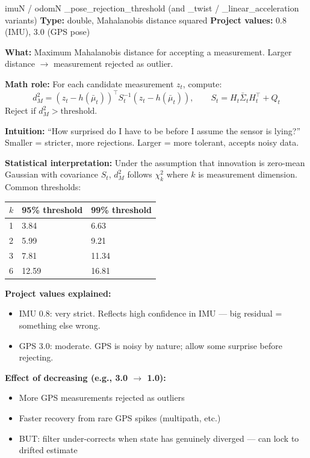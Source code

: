 \documentclass[11pt,a4paper]{article}
\begin{document}
\begin{paramcard}{imuN / odomN \_pose\_rejection\_threshold (and \_twist / \_linear\_acceleration variants)}
\textbf{Type:} double, Mahalanobis distance squared \quad \textbf{Project values:} 0.8 (IMU), 3.0 (GPS pose)

\textbf{What:} Maximum Mahalanobis distance for accepting a measurement. Larger distance $\to$ measurement rejected as outlier.

\textbf{Math role:} For each candidate measurement $z_t$, compute:
\[
d_M^2 = (z_t - h(\bar{\mu}_t))^\top S_t^{-1} (z_t - h(\bar{\mu}_t)), \qquad S_t = H_t \bar{\Sigma}_t H_t^\top + Q_t
\]
Reject if $d_M^2 > \text{threshold}$.

\textbf{Intuition:} ``How surprised do I have to be before I assume the sensor is lying?'' Smaller = stricter, more rejections. Larger = more tolerant, accepts noisy data.

\textbf{Statistical interpretation:} Under the assumption that innovation is zero-mean Gaussian with covariance $S_t$, $d_M^2$ follows $\chi^2_k$ where $k$ is measurement dimension. Common thresholds:
\begin{center}
\begin{tabular}{lll}
\toprule
$k$ & 95\% threshold & 99\% threshold \\
\midrule
1 & 3.84 & 6.63 \\
2 & 5.99 & 9.21 \\
3 & 7.81 & 11.34 \\
6 & 12.59 & 16.81 \\
\bottomrule
\end{tabular}
\end{center}

\textbf{Project values explained:}
\begin{itemize}
\item IMU 0.8: very strict. Reflects high confidence in IMU --- big residual = something else wrong.
\item GPS 3.0: moderate. GPS is noisy by nature; allow some surprise before rejecting.
\end{itemize}

\textbf{Effect of decreasing (e.g., 3.0 $\to$ 1.0):}
\begin{itemize}
\item More GPS measurements rejected as outliers
\item Faster recovery from rare GPS spikes (multipath, etc.)
\item BUT: filter under-corrects when state has genuinely diverged --- can lock to drifted estimate
\end{itemize}


\end{paramcard}
\end{document}
